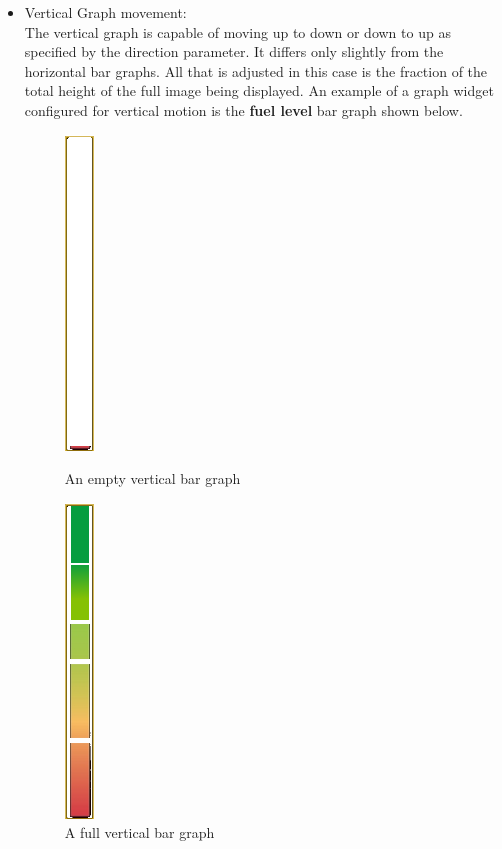 \documentclass[11pt]{report} %
\begin{document}
\begin{itemize}
	\item Vertical Graph movement: \\
	The vertical graph is capable of moving up to down or down to up as 
	specified by the direction parameter. It differs only slightly from the horizontal
	bar graphs. All that is adjusted in this case is the fraction of the total height 
	of the full image being displayed. An example of a graph widget configured for vertical
	motion is the {\bf fuel level} bar graph shown below.\\
	
	\begin{figure}[ht]
	\begin{minipage}[b]{0.5\linewidth}
	\centering
	\includegraphics[scale=0.50]{images/fuel_empty.png}
	\caption{An empty vertical bar graph}
	\label{fig:figure1}
	\end{minipage}
	\hspace{0.5cm}
	\begin{minipage}[b]{0.5\linewidth}
	\centering
	\includegraphics[scale=0.50]{images/fuel_full.png}
	\caption{A full vertical bar graph}
	\label{fig:figure2}
	\end{minipage}
	\end{figure}		
	

\end{itemize}
\end{document}

